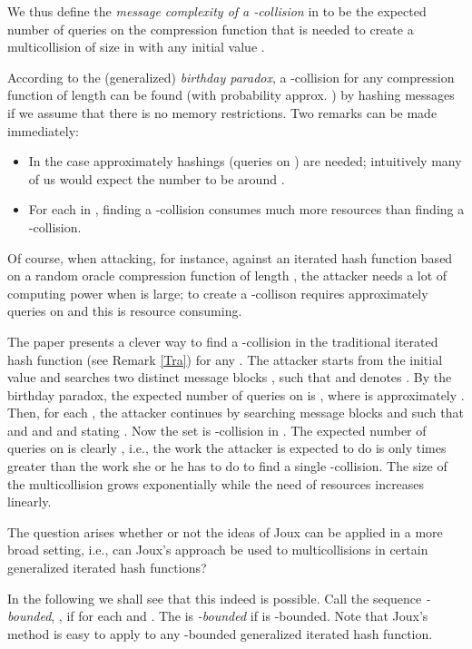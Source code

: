 \documentclass[submission,copyright,creativecommons]{eptcs}
\begin{document}
We thus define the \textit{message complexity of a -collision} in  to be the expected number of queries on the compression function  that is needed to create a multicollision of size  in  with any initial value .

According to the (generalized) \textit{birthday paradox}, a -collision for any compression function  of length  can be found 
(with probability approx. ) by hashing   messages \cite{STKT} if 
we assume that there is no memory restrictions. Two remarks can be made immediately: 

\begin{itemize}
\item[] In the case  approximately  hashings (queries on ) are needed; intuitively many of us 
would expect the number to be around .
\item[] For each  in , finding a -collision consumes much more resources than finding a 
-collision.
\end{itemize}

Of course, when attacking, for instance, against an iterated hash function based on a random oracle compression function of length , the attacker needs a lot of computing power when  is large; to create a -collison requires approximately  queries on   and this is resource consuming.   

The paper \cite{Jou} presents a clever way to find a -collision in the traditional iterated hash function  (see Remark \ref{Tra}) for any .   
The attacker starts from the initial value  and searches two distinct message blocks ,  such that  and denotes  
. By the birthday paradox, the expected number of queries on  is  , where  is approximately .
Then, for each , the attacker continues by searching message blocks  and  such that  and 
 and and stating . Now the set 
 is -collision in . The expected number of queries on  is clearly , i.e., the work the attacker is expected to do is only  times greater than the work she or he has to do to find a single -collision. The size of the multicollision grows exponentially while the need of resources increases linearly.  

The question arises whether or not the ideas of Joux can be applied in a more broad setting, i.e., can Joux's approach be used to multicollisions in certain generalized iterated hash functions? 

In the following we shall see that this indeed is possible. Call the sequence 
\textit{-bounded}, , if  for each  and . The   is \textit{-bounded} if  is -bounded. Note that Joux's method is easy to apply to any -bounded generalized iterated hash function. 
\end{document}
